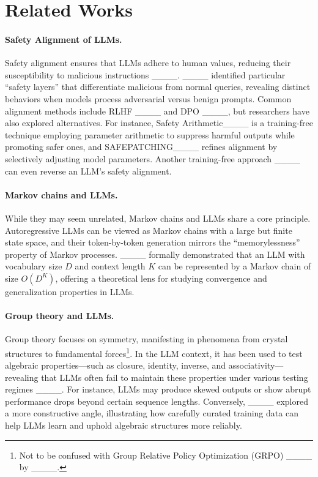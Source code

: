 \section{Related Works}
\label{sec:related}

\paragraph{Safety Alignment of LLMs.}
Safety alignment ensures that LLMs adhere to human values, reducing their susceptibility to malicious instructions ____. ____ identified particular ``safety layers” that differentiate malicious from normal queries, revealing distinct behaviors when models process adversarial versus benign prompts. Common alignment methods include RLHF ____ and DPO ____, but researchers have also explored alternatives. For instance, Safety Arithmetic____ is a training-free technique employing parameter arithmetic to suppress harmful outputs while promoting safer ones, and SAFEPATCHING____ refines alignment by selectively adjusting model parameters. Another training-free approach ____ can even reverse an LLM’s safety alignment.

\paragraph{Markov chains and LLMs.}
While they may seem unrelated, Markov chains and LLMs share a core principle. Autoregressive LLMs can be viewed as Markov chains with a large but finite state space, and their token-by-token generation mirrors the “memorylessness” property of Markov processes. ____ formally demonstrated that an LLM with vocabulary size $D$ and context length $K$ can be represented by a Markov chain of size $O(D^K)$, offering a theoretical lens for studying convergence and generalization properties in LLMs.

\paragraph{Group theory and LLMs.}  
Group theory focuses on symmetry, manifesting in phenomena from crystal structures to fundamental forces\footnote{Not to be confused with Group Relative Policy Optimization (GRPO) ____ by ____.}. In the LLM context, it has been used to test algebraic properties—such as closure, identity, inverse, and associativity—revealing that LLMs often fail to maintain these properties under various testing regimes ____. For instance, LLMs may produce skewed outputs or show abrupt performance drops beyond certain sequence lengths. Conversely, ____ explored a more constructive angle, illustrating how carefully curated training data can help LLMs learn and uphold algebraic structures more reliably.
